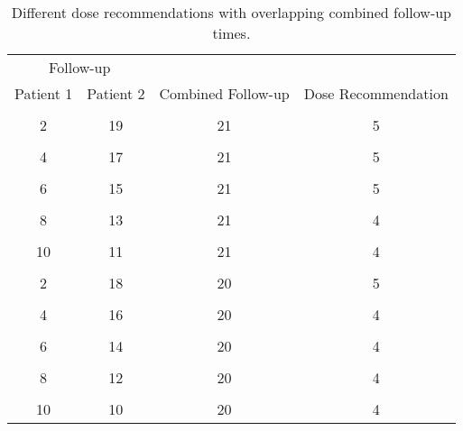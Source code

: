 \begin{table}[H]
	
	\caption{\label{tab_tite-dtp:TITEDTP_c2NNprob}Different dose recommendations with overlapping combined follow-up times.}
	\centering
	\fontsize{11}{13}\selectfont
		\begin{tabular}[t]{cccc}
	\toprule
	\multicolumn{2}{c}{Follow-up} & \multicolumn{2}{c}{ } \\
	\cmidrule(l{3pt}r{3pt}){1-2}
	Patient 1 & Patient 2 & Combined Follow-up & Dose Recommendation\\
	\midrule
	\cellcolor{gray!6}{1} & \cellcolor{gray!6}{20} & \cellcolor{gray!6}{21} & \cellcolor{gray!6}{5}\\
	2 & 19 & 21 & 5\\
	\cellcolor{gray!6}{3} & \cellcolor{gray!6}{18} & \cellcolor{gray!6}{21} & \cellcolor{gray!6}{5}\\
	4 & 17 & 21 & 5\\
	\cellcolor{gray!6}{5} & \cellcolor{gray!6}{16} & \cellcolor{gray!6}{21} & \cellcolor{gray!6}{5}\\
	6 & 15 & 21 & 5\\
	\cellcolor{gray!6}{7} & \cellcolor{gray!6}{14} & \cellcolor{gray!6}{21} & \cellcolor{gray!6}{4}\\
	8 & 13 & 21 & 4\\
	\cellcolor{gray!6}{9} & \cellcolor{gray!6}{12} & \cellcolor{gray!6}{21} & \cellcolor{gray!6}{4}\\
	10 & 11 & 21 & 4\\
	\cellcolor{gray!6}{1} & \cellcolor{gray!6}{19} & \cellcolor{gray!6}{20} & \cellcolor{gray!6}{5}\\
	2 & 18 & 20 & 5\\
	\cellcolor{gray!6}{3} & \cellcolor{gray!6}{17} & \cellcolor{gray!6}{20} & \cellcolor{gray!6}{4}\\
	4 & 16 & 20 & 4\\
	\cellcolor{gray!6}{5} & \cellcolor{gray!6}{15} & \cellcolor{gray!6}{20} & \cellcolor{gray!6}{4}\\
	6 & 14 & 20 & 4\\
	\cellcolor{gray!6}{7} & \cellcolor{gray!6}{13} & \cellcolor{gray!6}{20} & \cellcolor{gray!6}{4}\\
	8 & 12 & 20 & 4\\
	\cellcolor{gray!6}{9} & \cellcolor{gray!6}{11} & \cellcolor{gray!6}{20} & \cellcolor{gray!6}{4}\\
	10 & 10 & 20 & 4\\
	\bottomrule
		\end{tabular}
\end{table}

